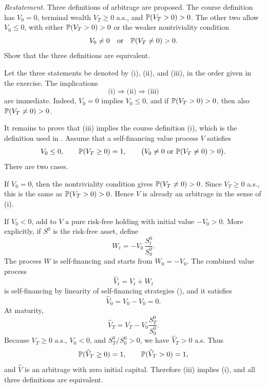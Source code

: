 \begin{exercise}
\emph{Restatement.}  Three definitions of arbitrage are proposed.  The
course definition has \(V_0=0\), terminal wealth \(V_T\ge 0\) a.s., and
\(\P(V_T>0)>0\).  The other two allow \(V_0\le 0\), with either
\(\P(V_T>0)>0\) or the weaker nontriviality condition
\[
  V_0\ne 0
  \quad\hbox{or}\quad
  \P(V_T\ne 0)>0.
\]
Show that the three definitions are equivalent.
\end{exercise}

\begin{solution}
Let the three statements be denoted by (i), (ii), and (iii), in the order
given in the exercise.  The implications
\[
  \text{(i)}\Rightarrow \text{(ii)}\Rightarrow \text{(iii)}
\]
are immediate.  Indeed, \(V_0=0\) implies \(V_0\le 0\), and if
\(\P(V_T>0)>0\), then also \(\P(V_T\ne 0)>0\).

It remains to prove that (iii) implies the course definition (i), which is the
definition used in .  Assume that a self-financing value
process \(V\) satisfies
\[
  V_0\le 0,\qquad \P(V_T\ge 0)=1,
  \qquad
  \bigl(V_0\ne 0\ \hbox{or}\ \P(V_T\ne 0)>0\bigr).
\]
There are two cases.

If \(V_0=0\), then the nontriviality condition gives
\(\P(V_T\ne 0)>0\).  Since \(V_T\ge 0\) a.s., this is the same as
\(\P(V_T>0)>0\).  Hence \(V\) is already an arbitrage in the sense of (i).

If \(V_0<0\), add to \(V\) a pure risk-free holding with initial value
\(-V_0>0\).  More explicitly, if \(S^0\) is the risk-free asset, define
\[
  W_t=-V_0\,\frac{S^0_t}{S^0_0}.
\]
The process \(W\) is self-financing and starts from \(W_0=-V_0\).  The
combined value process
\[
  \widehat V_t=V_t+W_t
\]
is self-financing by linearity of self-financing strategies
(), and it satisfies
\[
  \widehat V_0=V_0-V_0=0.
\]
At maturity,
\[
  \widehat V_T=V_T-V_0\frac{S^0_T}{S^0_0}.
\]
Because \(V_T\ge 0\) a.s., \(V_0<0\), and \(S^0_T/S^0_0>0\), we have
\(\widehat V_T>0\) a.s.  Thus
\[
  \P(\widehat V_T\ge 0)=1,
  \qquad
  \P(\widehat V_T>0)=1,
\]
and \(\widehat V\) is an arbitrage with zero initial capital.  Therefore
(iii) implies (i), and all three definitions are equivalent.
\end{solution}
